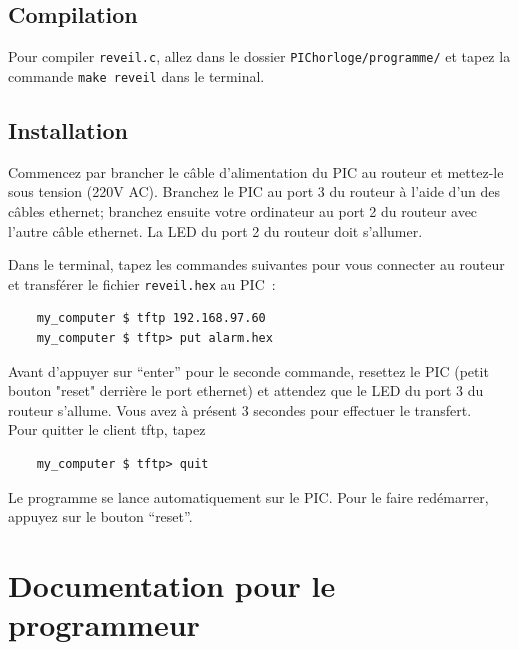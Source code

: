 \documentclass[12pt,a4paper]{article}
\begin{document}
\subsection{Compilation}
Pour compiler \texttt{reveil.c}, allez dans le dossier \texttt{PIChorloge/programme/} et tapez la commande \texttt{make reveil} dans le terminal.

\subsection{Installation}
Commencez par brancher le câble d'alimentation du PIC au routeur et mettez-le sous tension (220V AC). Branchez le PIC au port 3 du routeur à l'aide d'un des câbles ethernet; branchez ensuite votre ordinateur au port 2 du routeur avec l'autre câble ethernet. La LED du port 2 du routeur doit s'allumer.

Dans le terminal, tapez les commandes suivantes pour vous connecter au routeur et transférer le fichier \texttt{reveil.hex} au PIC~:
\begin{verbatim}
    my_computer $ tftp 192.168.97.60
    my_computer $ tftp> put alarm.hex
\end{verbatim}
Avant d'appuyer sur ``enter'' pour le seconde commande, resettez le PIC (petit bouton "reset" derrière le port ethernet) et attendez que le LED du port 3 du routeur s'allume. Vous avez à présent 3 secondes pour effectuer le transfert.\\
Pour quitter le client tftp, tapez
\begin{verbatim}
    my_computer $ tftp> quit
\end{verbatim}
Le programme se lance automatiquement sur le PIC. Pour le faire redémarrer, appuyez sur le bouton ``reset''.


\section{Documentation pour le programmeur}
    
\end{document}
